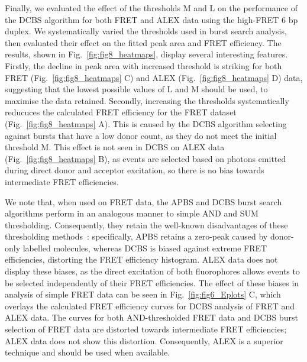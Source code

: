 Finally, we evaluated the effect of the thresholds M and L on the performance of the DCBS algorithm for both FRET and ALEX data using the high-FRET 6 bp duplex. We systematically varied the thresholds used in burst search analysis, then evaluated their effect on the fitted peak area and FRET efficiency. The results, shown in Fig.~\ref{fig:fig8_heatmaps}, display several interesting features. Firstly, the decline in peak area with increased threshold is striking for both FRET (Fig.~\ref{fig:fig8_heatmaps} C) and ALEX (Fig.~\ref{fig:fig8_heatmaps} D) data, suggesting that the lowest possible values of L and M should be used, to maximise the data retained. Secondly, increasing the thresholds systematically reducuces the calculated FRET efficiency for the FRET dataset (Fig.~\ref{fig:fig8_heatmaps} A). This is caused by the DCBS algorithm selecting against bursts that have a low donor count, as they do not meet the initial threshold M. This effect is not seen in DCBS on ALEX data (Fig.~\ref{fig:fig8_heatmaps} B), as events are selected based on photons emitted during direct donor and acceptor excitation, so there is no bias towards intermediate FRET efficiencies.

We note that, when used on FRET data, the APBS and DCBS burst search algorithms perform in an analogous manner to simple AND and SUM thresholding. Consequently, they retain the well-known disadvantages of these thresholding methods~\cite{murphy14}: specifically, APBS retains a zero-peak caused by donor-only labelled molecules, whereas DCBS is biased against extreme FRET efficiencies, distorting the FRET efficiency histogram. ALEX data does not display these biases, as the direct excitation of both fluorophores allows events to be selected independently of their FRET efficiencies. The effect of these biases in analysis of simple FRET data can be seen in Fig.~\ref{fig:fig6_Eplots} C, which overlays the calculated FRET efficiency curves for DCBS analysis of FRET and ALEX data. The curves for both AND-thresholded FRET data and DCBS burst selection of FRET data are distorted towards intermediate FRET efficiencies; ALEX data does not show this distortion. Consequently, ALEX is a superior technique and should be used when available.


